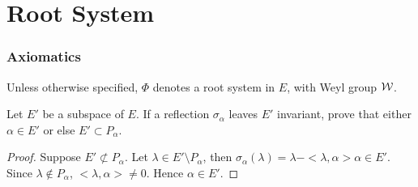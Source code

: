 \part{Root System}
\section{Axiomatics}
Unless otherwise specified, $\Phi$ denotes a root system in $E$, with Weyl group ${\cal W}$.

\begin{ex}
  Let $E'$ be a subspace of $E$. If a reflection $\sigma_{\alpha}$ leaves $E'$ invariant, prove that either $\alpha \in E'$ or else $E' \subset P_{\alpha}$.
\end{ex}
\begin{proof}
  Suppose $E' \not\subset P_{\alpha}$. Let $\lambda\in E'\setminus P_{\alpha}$, then $\sigma_{\alpha}(\lambda) = \lambda - <\lambda,\alpha> \alpha \in E'$. Since $\lambda\not\in P_{\alpha}$, $<\lambda,\alpha>\neq0$. Hence $\alpha\in E'$.
\end{proof}


